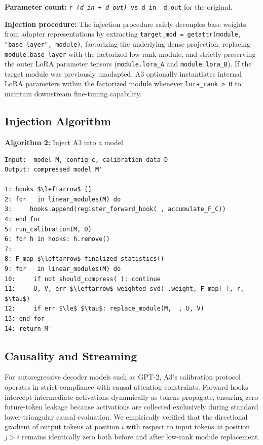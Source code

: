 \textbf{Parameter count:} \texttt{r \textit{ (d\_in + d\_out)} vs \texttt{d\_in } d\_out} for the original.

\textbf{Injection procedure:}
The injection procedure safely decouples base weights from adapter representations by extracting \texttt{target\_mod = getattr(module, "base\_layer", module)}, factorizing the underlying dense projection, replacing \texttt{module.base\_layer} with the factorized low-rank module, and strictly preserving the outer LoRA parameter tensors (\texttt{module.lora\_A} and \texttt{module.lora\_B}). If the target module was previously unadapted, A3 optionally instantiates internal LoRA parameters within the factorized module whenever \texttt{lora\_rank > 0} to maintain downstream fine-tuning capability.

\subsection{Injection Algorithm}

\textbf{Algorithm 2:} Inject A3 into a model
\begin{lstlisting}
Input:  model M, config c, calibration data D
Output: compressed model M'

1: hooks $\leftarrow$ []
2: for   in linear_modules(M) do
3:     hooks.append(register_forward_hook( , accumulate_F_C))
4: end for
5: run_calibration(M, D)
6: for h in hooks: h.remove()
7:
8: F_map $\leftarrow$ finalized_statistics()
9: for   in linear_modules(M) do
10:     if not should_compress( ): continue
11:     U, V, err $\leftarrow$ weighted_svd( .weight, F_map[ ], r, $\tau$)
12:     if err $\le$ $\tau$: replace_module(M,  , U, V)
13: end for
14: return M'
\end{lstlisting}

\subsection{Causality and Streaming}

For autoregressive decoder models such as GPT-2, A3's calibration protocol operates in strict compliance with causal attention constraints. Forward hooks intercept intermediate activations dynamically as tokens propagate, ensuring zero future-token leakage because activations are collected exclusively during standard lower-triangular causal evaluation. We empirically verified that the directional gradient of output tokens at position $i$ with respect to input tokens at position $j > i$ remains identically zero both before and after low-rank module replacement.

